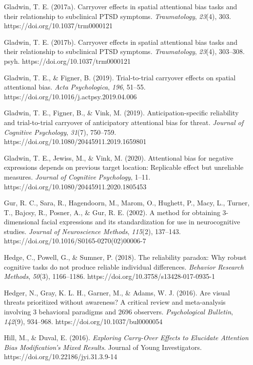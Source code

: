 \documentclass{article}
\begin{document}
Gladwin, T. E. (2017a). Carryover effects in spatial attentional bias tasks and their relationship to subclinical PTSD symptoms. \emph{Traumatology}, \emph{23}(4), 303. https://doi.org/10.1037/trm0000121

Gladwin, T. E. (2017b). Carryover effects in spatial attentional bias tasks and their relationship to subclinical PTSD symptoms. \emph{Traumatology}, \emph{23}(4), 303--308. psyh. https://doi.org/10.1037/trm0000121

Gladwin, T. E., \& Figner, B. (2019). Trial-to-trial carryover effects on spatial attentional bias. \emph{Acta Psychologica}, \emph{196}, 51--55. https://doi.org/10.1016/j.actpsy.2019.04.006

Gladwin, T. E., Figner, B., \& Vink, M. (2019). Anticipation-specific reliability and trial-to-trial carryover of anticipatory attentional bias for threat. \emph{Journal of Cognitive Psychology}, \emph{31}(7), 750--759. https://doi.org/10.1080/20445911.2019.1659801

Gladwin, T. E., Jewiss, M., \& Vink, M. (2020). Attentional bias for negative expressions depends on previous target location: Replicable effect but unreliable measures. \emph{Journal of Cognitive Psychology}, 1--11. https://doi.org/10.1080/20445911.2020.1805453

Gur, R. C., Sara, R., Hagendoorn, M., Marom, O., Hughett, P., Macy, L., Turner, T., Bajcsy, R., Posner, A., \& Gur, R. E. (2002). A method for obtaining 3-dimensional facial expressions and its standardization for use in neurocognitive studies. \emph{Journal of Neuroscience Methods}, \emph{115}(2), 137--143. https://doi.org/10.1016/S0165-0270(02)00006-7

Hedge, C., Powell, G., \& Sumner, P. (2018). The reliability paradox: Why robust cognitive tasks do not produce reliable individual differences. \emph{Behavior Research Methods}, \emph{50}(3), 1166--1186. https://doi.org/10.3758/s13428-017-0935-1

Hedger, N., Gray, K. L. H., Garner, M., \& Adams, W. J. (2016). Are visual threats prioritized without awareness? A critical review and meta-analysis involving 3 behavioral paradigms and 2696 observers. \emph{Psychological Bulletin}, \emph{142}(9), 934--968. https://doi.org/10.1037/bul0000054

Hill, M., \& Duval, E. (2016). \emph{Exploring Carry-Over Effects to Elucidate Attention Bias Modification's Mixed Results}. Journal of Young Investigators. https://doi.org/10.22186/jyi.31.3.9-14
\end{document}

